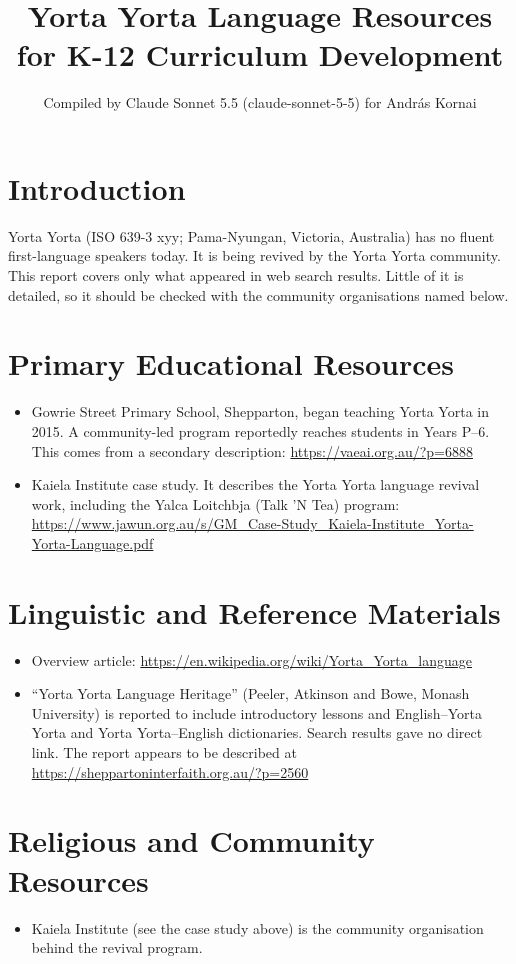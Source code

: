 \documentclass[12pt]{article}
\title{Yorta Yorta Language Resources for K-12 Curriculum Development}
\author{Compiled by Claude Sonnet 5.5 (claude-sonnet-5-5) for Andr\'as Kornai}
\date{}
\begin{document}
\maketitle

\section{Introduction}
Yorta Yorta (ISO 639-3 xyy; Pama-Nyungan, Victoria, Australia) has no fluent first-language speakers today. It is being revived by the Yorta Yorta community. This report covers only what appeared in web search results. Little of it is detailed, so it should be checked with the community organisations named below.

\section{Primary Educational Resources}
\begin{itemize}
\item Gowrie Street Primary School, Shepparton, began teaching Yorta Yorta in 2015. A community-led program reportedly reaches students in Years P--6. This comes from a secondary description: \url{https://vaeai.org.au/?p=6888}
\item Kaiela Institute case study. It describes the Yorta Yorta language revival work, including the Yalca Loitchbja (Talk 'N Tea) program: \url{https://www.jawun.org.au/s/GM_Case-Study_Kaiela-Institute_Yorta-Yorta-Language.pdf}
\end{itemize}

\section{Linguistic and Reference Materials}
\begin{itemize}
\item Overview article: \url{https://en.wikipedia.org/wiki/Yorta_Yorta_language}
\item ``Yorta Yorta Language Heritage'' (Peeler, Atkinson and Bowe, Monash University) is reported to include introductory lessons and English--Yorta Yorta and Yorta Yorta--English dictionaries. Search results gave no direct link. The report appears to be described at \url{https://sheppartoninterfaith.org.au/?p=2560}
\end{itemize}

\section{Religious and Community Resources}
\begin{itemize}
\item Kaiela Institute (see the case study above) is the community organisation behind the revival program.
\end{itemize}
\end{document}
